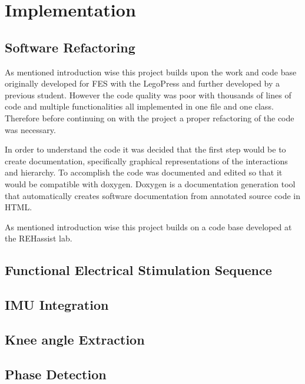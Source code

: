 
\section{Implementation}

\subsection{Software Refactoring}
As mentioned introduction wise this project builds upon the work and code base originally developed for FES with the LegoPress \cite{olivier_legopress_2014} and further developed by a previous student. However the code quality was poor with thousands of lines of code and multiple functionalities all implemented in one file and one class. Therefore before continuing on with the project a proper refactoring of the code was necessary.

In order to understand the code it was decided that the first step would be to create documentation, specifically graphical representations of the interactions and hierarchy. To accomplish the code was documented and edited so that it would be compatible with doxygen. Doxygen is a documentation generation tool that automatically creates software documentation from annotated source code in HTML. 



As mentioned introduction wise this project builds on a code base developed at the REHassist lab. 

\subsection{Functional Electrical Stimulation Sequence}

\subsection{IMU Integration}

\subsection{Knee angle Extraction}

\subsection{Phase Detection}

